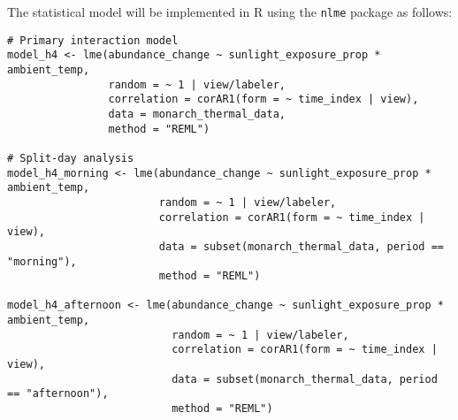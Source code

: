 The statistical model will be implemented in R using the \texttt{nlme} package as follows:

\begin{verbatim}
# Primary interaction model  
model_h4 <- lme(abundance_change ~ sunlight_exposure_prop * ambient_temp,
                random = ~ 1 | view/labeler,
                correlation = corAR1(form = ~ time_index | view),
                data = monarch_thermal_data,
                method = "REML")

# Split-day analysis
model_h4_morning <- lme(abundance_change ~ sunlight_exposure_prop * ambient_temp,
                        random = ~ 1 | view/labeler,
                        correlation = corAR1(form = ~ time_index | view),
                        data = subset(monarch_thermal_data, period == "morning"),
                        method = "REML")

model_h4_afternoon <- lme(abundance_change ~ sunlight_exposure_prop * ambient_temp,
                          random = ~ 1 | view/labeler,
                          correlation = corAR1(form = ~ time_index | view),
                          data = subset(monarch_thermal_data, period == "afternoon"),
                          method = "REML")
\end{verbatim}